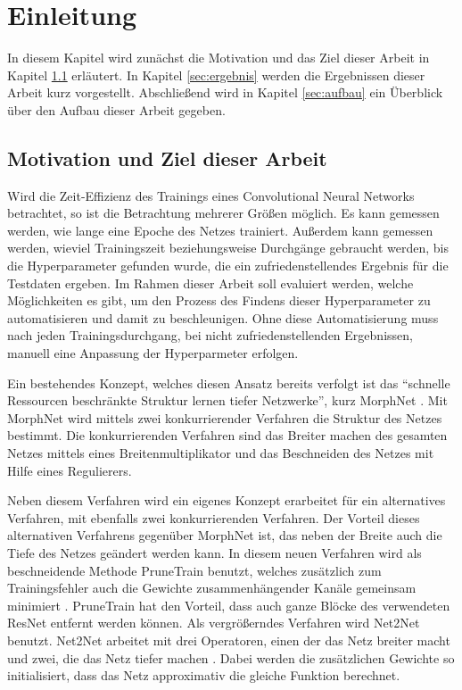 \chapter{Einleitung}
\label{sec:EinleitungGesamt}


In diesem Kapitel wird zunächst die Motivation und das Ziel dieser Arbeit in Kapitel \ref{sec:first} erläutert. In Kapitel \ref{sec:ergebnis} werden die Ergebnissen dieser Arbeit kurz vorgestellt. Abschließend wird in Kapitel \ref{sec:aufbau} ein Überblick über den Aufbau dieser Arbeit gegeben.

\section{Motivation und Ziel dieser Arbeit}\label{sec:first}
Wird die Zeit-Effizienz des Trainings eines Convolutional Neural Networks betrachtet, so ist die Betrachtung mehrerer Größen möglich. Es kann gemessen werden, wie lange eine Epoche des Netzes trainiert. Außerdem kann gemessen werden, wieviel Trainingszeit beziehungsweise Durchgänge gebraucht werden, bis die Hyperparameter gefunden wurde, die ein zufriedenstellendes Ergebnis für die Testdaten ergeben. Im Rahmen dieser Arbeit soll evaluiert werden, welche Möglichkeiten es gibt, um den Prozess des Findens dieser Hyperparameter zu automatisieren und damit zu beschleunigen. Ohne diese Automatisierung muss nach jeden Trainingsdurchgang, bei nicht zufriedenstellenden Ergebnissen, manuell eine Anpassung der Hyperparmeter erfolgen. 


Ein bestehendes Konzept, welches diesen Ansatz bereits verfolgt ist das "`schnelle Ressourcen beschränkte Struktur lernen tiefer Netzwerke"', kurz MorphNet \cite{morphnet}. Mit MorphNet wird mittels zwei konkurrierender Verfahren die Struktur des Netzes bestimmt. Die konkurrierenden Verfahren sind das Breiter machen des gesamten Netzes mittels eines Breitenmultiplikator und das Beschneiden des Netzes mit Hilfe eines Regulierers. 


Neben diesem Verfahren wird ein eigenes Konzept erarbeitet für ein alternatives Verfahren, mit ebenfalls zwei konkurrierenden Verfahren. Der Vorteil dieses alternativen Verfahrens gegenüber MorphNet ist, das neben der Breite auch die Tiefe des Netzes geändert werden kann. In diesem neuen Verfahren wird als beschneidende Methode PruneTrain benutzt, welches zusätzlich zum Trainingsfehler auch die Gewichte zusammenhängender Kanäle gemeinsam minimiert \cite{prunetrain}. PruneTrain hat den Vorteil, dass auch ganze Blöcke des verwendeten ResNet entfernt werden können. Als vergrößerndes Verfahren wird Net2Net benutzt. Net2Net arbeitet mit drei Operatoren, einen der das Netz breiter macht und zwei, die das Netz tiefer machen \cite{net2net}. Dabei werden die zusätzlichen Gewichte so initialisiert, dass das Netz approximativ die gleiche Funktion berechnet. 


